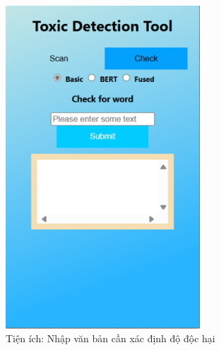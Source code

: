 \begin{figure}[htb!]
\begin{subfigure}[b]{0.33\textwidth}
        \includegraphics[width=0.8\textwidth]{image/ex_text_enter.png}
        \caption{Tiện ích: Nhập văn bản cần xác định độ độc hại}
        \label{figure:ex_text_enter}
    \end{subfigure}%
    \begin{subfigure}[b]{0.33\textwidth}
        \centering

\end{subfigure}
\end{figure}
